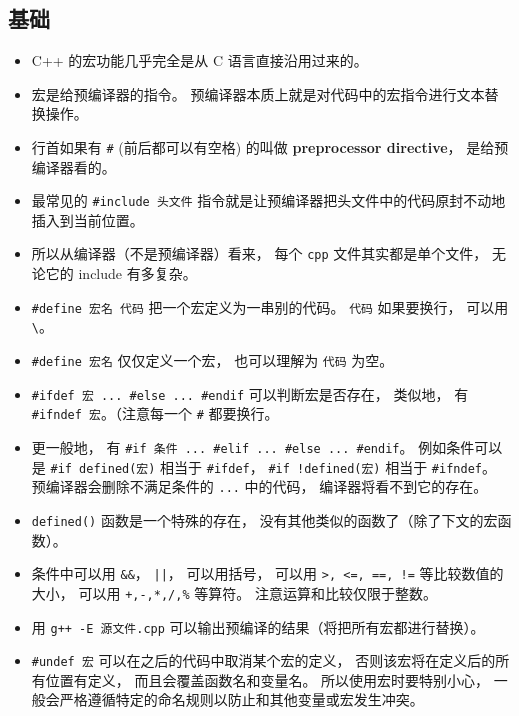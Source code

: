 
\begin{issues}
\issueDraft
\end{issues}


\subsection{基础}
\begin{itemize}
\item C++ 的宏功能几乎完全是从 C 语言直接沿用过来的。
\item 宏是给预编译器的指令。 预编译器本质上就是对代码中的宏指令进行文本替换操作。
\item 行首如果有 \verb|#| (前后都可以有空格) 的叫做 \textbf{preprocessor directive}， 是给预编译器看的。
\item 最常见的 \verb|#include 头文件| 指令就是让预编译器把头文件中的代码原封不动地插入到当前位置。
\item 所以从编译器（不是预编译器）看来， 每个 \verb|cpp| 文件其实都是单个文件， 无论它的 include 有多复杂。
\item \verb|#define 宏名 代码| 把一个宏定义为一串别的代码。 \verb|代码| 如果要换行， 可以用 \verb|\|。
\item \verb|#define 宏名| 仅仅定义一个宏， 也可以理解为 \verb|代码| 为空。
\item \verb|#ifdef 宏 ... #else ... #endif| 可以判断宏是否存在， 类似地， 有 \verb|#ifndef 宏|。（注意每一个 \verb|#| 都要换行。
\item 更一般地， 有 \verb|#if 条件 ... #elif ... #else ... #endif|。 例如条件可以是 \verb|#if defined(宏)| 相当于 \verb|#ifdef|， \verb|#if !defined(宏)| 相当于 \verb|#ifndef|。 预编译器会删除不满足条件的 \verb|...| 中的代码， 编译器将看不到它的存在。
\item \verb|defined()| 函数是一个特殊的存在， 没有其他类似的函数了（除了下文的宏函数）。
\item 条件中可以用 \verb|&&|， \verb`||`， 可以用括号， 可以用 \verb|>, <=, ==, !=| 等比较数值的大小， 可以用 \verb|+,-,*,/,%| 等算符。 注意运算和比较仅限于整数。
\item 用 \verb|g++ -E 源文件.cpp| 可以输出预编译的结果（将把所有宏都进行替换）。
\item \verb|#undef 宏| 可以在之后的代码中取消某个宏的定义， 否则该宏将在定义后的所有位置有定义， 而且会覆盖函数名和变量名。 所以使用宏时要特别小心， 一般会严格遵循特定的命名规则以防止和其他变量或宏发生冲突。

\end{itemize}
